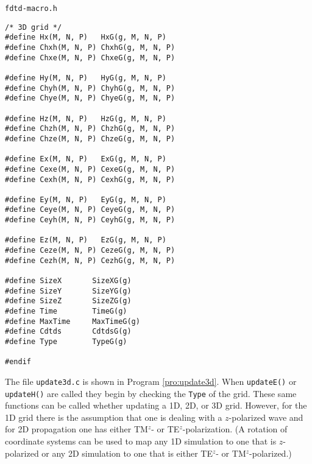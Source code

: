 \begin{program} {\tt fdtd-macro.h}
\begin{lstlisting}
/* 3D grid */
#define Hx(M, N, P)   HxG(g, M, N, P)   
#define Chxh(M, N, P) ChxhG(g, M, N, P) 
#define Chxe(M, N, P) ChxeG(g, M, N, P) 

#define Hy(M, N, P)   HyG(g, M, N, P)   
#define Chyh(M, N, P) ChyhG(g, M, N, P) 
#define Chye(M, N, P) ChyeG(g, M, N, P) 

#define Hz(M, N, P)   HzG(g, M, N, P)   
#define Chzh(M, N, P) ChzhG(g, M, N, P) 
#define Chze(M, N, P) ChzeG(g, M, N, P) 

#define Ex(M, N, P)   ExG(g, M, N, P)   
#define Cexe(M, N, P) CexeG(g, M, N, P) 
#define Cexh(M, N, P) CexhG(g, M, N, P) 

#define Ey(M, N, P)   EyG(g, M, N, P)   
#define Ceye(M, N, P) CeyeG(g, M, N, P) 
#define Ceyh(M, N, P) CeyhG(g, M, N, P) 

#define Ez(M, N, P)   EzG(g, M, N, P)
#define Ceze(M, N, P) CezeG(g, M, N, P)
#define Cezh(M, N, P) CezhG(g, M, N, P) 

#define SizeX       SizeXG(g)
#define SizeY       SizeYG(g)
#define SizeZ       SizeZG(g)
#define Time        TimeG(g)
#define MaxTime     MaxTimeG(g)   
#define Cdtds       CdtdsG(g)
#define Type        TypeG(g)

#endif
\end{lstlisting}
\end{program}

The file {\tt update3d.c} is shown in Program \ref{pro:update3d}.
When {\tt updateE()} or {\tt updateH()} are called they begin by
checking the {\tt Type} of the grid.  These same functions can be
called whether updating a 1D, 2D, or 3D grid.  However, for the 1D
grid there is the assumption that one is dealing with a $z$-polarized
wave and for 2D propagation one has either TM$^z$- or
TE$^z$-polarization.  (A rotation of coordinate systems can be used to
map any 1D simulation to one that is $z$-polarized or any 2D
simulation to one that is either TE$^z$- or TM$^z$-polarized.)

